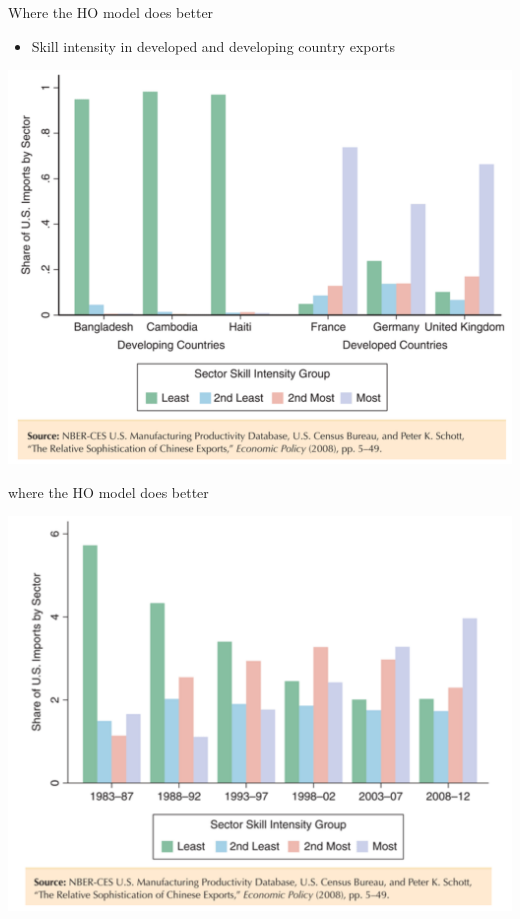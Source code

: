 \documentclass[ignorenonframetext,]{beamer}
\begin{document}
\begin{frame}{Where the HO model does better}

    \begin{itemize}
        \item Skill intensity in developed and developing country exports
    \end{itemize}
    \includegraphics[scale=0.20]{schott1.png}

\end{frame}

\begin{frame}{where the HO model does better}

    \includegraphics[scale=0.23]{china_schott.png}

\end{frame}
\end{document}
